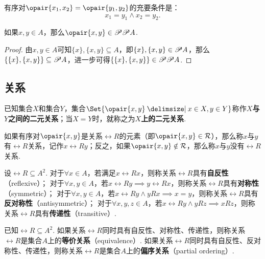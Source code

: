 \begin{theorem}
有序对\(\opair{x_1,x_2} = \opair{y_1,y_2}\)的充要条件是：\[
x_1=y_1 \land x_2=y_2.
\]
\end{theorem}

\begin{theorem}
如果\(x,y \in A\)，那么\(\opair{x,y} \in \Powerset\Powerset A\).
\begin{proof}
由\(x,y \in A\)可知\(\{x\},\{x,y\} \subseteq A\)，即\(\{x\},\{x,y\} \in \mathscr{P} A\)，那么\(\{\{x\},\{x,y\}\} \subseteq \mathscr{P} A\)，进一步可得\(\{\{x\},\{x,y\}\} \in \mathscr{P}\mathscr{P} A\).
\end{proof}
\end{theorem}

\subsection{关系}
\begin{definition}
已知集合\(X\)和集合\(Y\)，集合\(\Set{ \opair{x,y} \given x \in X, y \in Y }\)称作\textbf{\(X\)与\(Y\)之间的二元关系}；当\(X = Y\)时，就称之为\textbf{\(X\)上的二元关系}.

如果有序对\(\opair{x,y}\)是关系\(\rel{R}\)的元素（即\(\opair{x,y} \in \rel{R}\)），那么称\(x\)与\(y\)有\(\rel{R}\)关系，记作\(x\rel{R}y\)；反之，如果\(\opair{x,y} \notin \rel{R}\)，那么称\(x\)与\(y\)没有\(\rel{R}\)关系.
\end{definition}

\begin{definition}
设\(\rel{R} \subseteq A^2\).
对于\(\forall x \in A\)，若满足\(x\rel{R}x\)，则称关系\(\rel{R}\)具有\textbf{自反性}（reflexive）；
对于\(\forall x,y \in A\)，若\(x\rel{R}y \implies y\rel{R}x\)，则称关系\(\rel{R}\)具有\textbf{对称性}（symmetric）；
对于\(\forall x,y \in A\)，若\(x\rel{R}y \land yRx \implies x = y\)，则称关系\(\rel{R}\)具有\textbf{反对称性}（antisymmetric）；
对于\(\forall x,y,z \in A\)，若\(x\rel{R}y \land yRz \implies xRz\)，则称关系\(\rel{R}\)具有\textbf{传递性}（transitive）.
\end{definition}

\begin{definition}
已知\(\rel{R} \subseteq A^2\).
如果关系\(\rel{R}\)同时具有自反性、对称性、传递性，则称关系\(\rel{R}\)是集合\(A\)上的\textbf{等价关系}（equivalence）.
如果关系\(\rel{R}\)同时具有自反性、反对称性、传递性，则称关系\(\rel{R}\)是集合\(A\)上的\textbf{偏序关系}（partial ordering）.
\end{definition}


